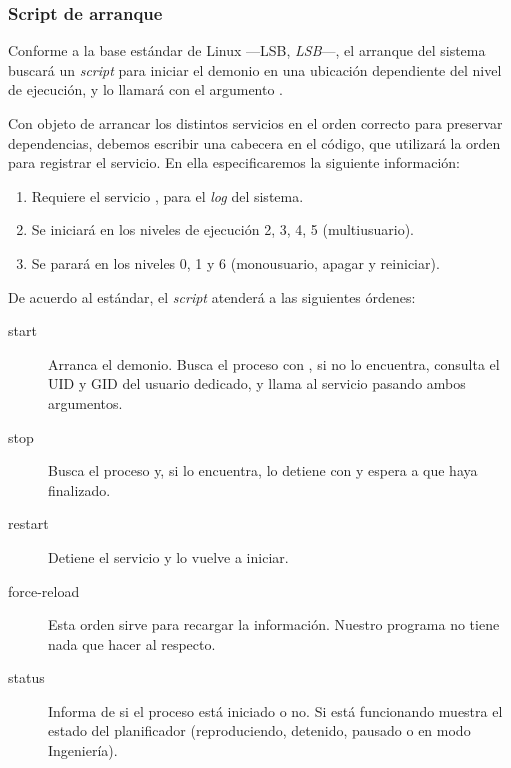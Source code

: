 \subsubsection{Script de arranque}

Conforme a la base estándar de Linux ---\acrshort{LSB}, \textit{\acrlong{LSB}}---, el arranque del sistema buscará un \textit{script} para iniciar el demonio en una ubicación dependiente del nivel de ejecución, y lo llamará con el argumento . \cite{debian_lsbinit}

Con objeto de arrancar los distintos servicios en el orden correcto para preservar dependencias, debemos escribir una cabecera en el código, que utilizará la orden  para registrar el servicio. En ella especificaremos la siguiente información:

\begin{enumerate}
	\item Requiere el servicio , para el \textit{log} del sistema.
	\item Se iniciará en los niveles de ejecución 2, 3, 4, 5 (multiusuario). \cite{wiki_runlevel}
	\item Se parará en los niveles 0, 1 y 6 (monousuario, apagar y reiniciar).
\end{enumerate}

De acuerdo al estándar, el \textit{script} atenderá a las siguientes órdenes:

\begin{description}
	\item[start] Arranca el demonio. Busca el proceso con , si no lo encuentra, consulta el \acrshort{UID} y \acrshort{GID} del usuario dedicado, y llama al servicio pasando ambos argumentos.
	
	\item[stop] Busca el proceso y, si lo encuentra, lo detiene con  y espera a que haya finalizado.
	
	\item[restart] Detiene el servicio y lo vuelve a iniciar.
	
	\item[force-reload] Esta orden sirve para recargar la información. Nuestro programa no tiene nada que hacer al respecto.
	
	\item[status] Informa de si el proceso está iniciado o no. Si está funcionando muestra el estado del planificador (reproduciendo, detenido, pausado o en modo Ingeniería).
\end{description}

